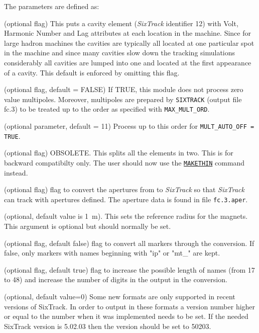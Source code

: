 The parameters are defined as: 
\begin{madlist}
    (optional flag) This puts a cavity element
   (\textit{SixTrack} identifier 12) with Volt, Harmonic Number and Lag
   attributes at each location in the machine. Since for large hadron
   machines the cavities are typically all located at one particular
   spot in the machine and since many cavities slow down the tracking
   simulations considerably all cavities are lumped into one and located
   at the first appearance of a cavity. This default is enforced by
   omitting this flag.  

    (optional flag, default = FALSE) If
   TRUE, this module does not process zero value multipoles. 
   Moreover, multipoles are prepared by \texttt{SIXTRACK}
   (output file fc.3) to be treated up to the order as specified with
   \texttt{MAX\_MULT\_ORD}.  

    (optional parameter, default = 11) Process up
   to this order for \texttt{MULT\_AUTO\_OFF = TRUE}.  

    (optional flag) OBSOLETE. This splits all the
   elements in  two. This is for backward compatibilty only. The user
   should now use the \hyperref[chap:makethin]{\texttt{MAKETHIN}} command
   instead.   

    (optional flag) flag to convert the apertures
   from \madx to \textit{SixTrack} so that \textit{SixTrack} can track
   with apertures defined. The aperture data is found in file
   \texttt{fc.3.aper}. 

    (optional, default value is 1~m). This sets the
   reference  radius for the magnets. This argument is optional but
   should normally be set. 

    (optional flag, default false) flag to convert all markers through the conversion. If false, only markers with names beginning with "ip" or "mt\_" are kept.

    (optional flag, default true) flag to increase the possible length of names (from 17 to 48) and increase the number of digits in the output in the conversion. 

    (optional, default value=0) Some new formats are only supported in recent versions of SixTrack. In order to output in these formats a version number higher or equal to the number when it was implemented needs to be set. If the needed SixTrack version is 5.02.03 then the version should be set to 50203.

\end{madlist}

